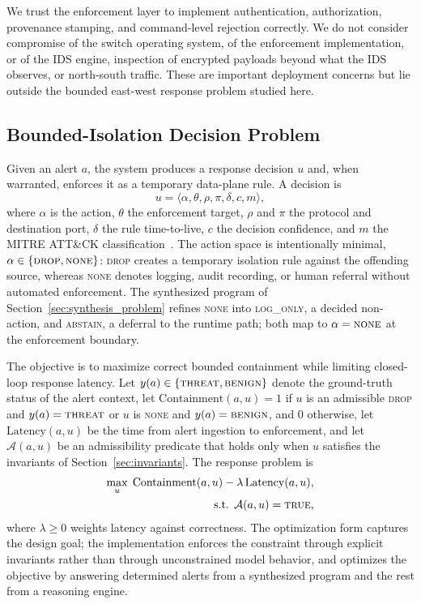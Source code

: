 \documentclass[final,5p]{elsarticle}
\begin{document}
We trust the enforcement layer to implement authentication, authorization, provenance stamping, and command-level rejection correctly. We do not consider compromise of the switch operating system, of the enforcement implementation, or of the IDS engine, inspection of encrypted payloads beyond what the IDS observes, or north-south traffic. These are important deployment concerns but lie outside the bounded east-west response problem studied here.

\subsection{Bounded-Isolation Decision Problem}
\label{sec:problem_statement}

Given an alert $a$, the system produces a response decision $u$ and, when warranted, enforces it as a temporary data-plane rule. A decision is
\[
u = \langle \alpha,\theta,\rho,\pi,\delta,c,m\rangle ,
\]
where $\alpha$ is the action, $\theta$ the enforcement target, $\rho$ and $\pi$ the protocol and destination port, $\delta$ the rule time-to-live, $c$ the decision confidence, and $m$ the MITRE ATT\&CK classification~\cite{strom2018mitre,mitre2026attack}. The action space is intentionally minimal, $\alpha \in \{\textsc{drop},\textsc{none}\}$: \textsc{drop} creates a temporary isolation rule against the offending source, whereas \textsc{none} denotes logging, audit recording, or human referral without automated enforcement. The synthesized program of Section~\ref{sec:synthesis_problem} refines \textsc{none} into \textsc{log\_only}, a decided non-action, and \textsc{abstain}, a deferral to the runtime path; both map to $\alpha=\textsc{none}$ at the enforcement boundary.

The objective is to maximize correct bounded containment while limiting closed-loop response latency. Let $y(a)\in\{\textsc{threat},\textsc{benign}\}$ denote the ground-truth status of the alert context, let $\mathrm{Containment}(a,u)=1$ if $u$ is an admissible \textsc{drop} and $y(a)=\textsc{threat}$ or $u$ is \textsc{none} and $y(a)=\textsc{benign}$, and $0$ otherwise, let $\mathrm{Latency}(a,u)$ be the time from alert ingestion to enforcement, and let $\mathcal{A}(a,u)$ be an admissibility predicate that holds only when $u$ satisfies the invariants of Section~\ref{sec:invariants}. The response problem is
\begin{equation}
\begin{aligned}
\max_u \; \mathrm{Containment}(a,u)-\lambda\,\mathrm{Latency}(a,u),
\\
\text{s.t. } \mathcal{A}(a,u)=\textsc{true},
\end{aligned}
\label{eq:containment}
\end{equation}
where $\lambda\ge 0$ weights latency against correctness. The optimization form captures the design goal; the implementation enforces the constraint through explicit invariants rather than through unconstrained model behavior, and optimizes the objective by answering determined alerts from a synthesized program and the rest from a reasoning engine.
\end{document}
